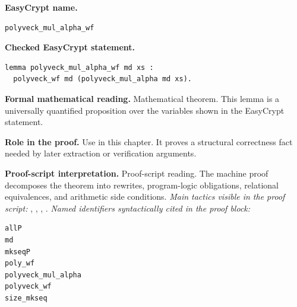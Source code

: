\begin{formaltheorem}
\noindent\textbf{EasyCrypt name.}
\begin{lstlisting}[language=EasyCrypt,basicstyle=\ttfamily\scriptsize]
polyveck_mul_alpha_wf
\end{lstlisting}
\noindent\textbf{Checked EasyCrypt statement.}
\begin{lstlisting}[language=EasyCrypt,basicstyle=\ttfamily\scriptsize]
lemma polyveck_mul_alpha_wf md xs :
  polyveck_wf md (polyveck_mul_alpha md xs).
\end{lstlisting}
\noindent\textbf{Formal mathematical reading.}
Mathematical theorem. This lemma is a universally quantified proposition over the variables shown in the EasyCrypt statement.

\noindent\textbf{Role in the proof.}
Use in this chapter. It proves a structural correctness fact needed by later extraction or verification arguments.

\noindent\textbf{Proof-script interpretation.}
Proof-script reading. The machine proof decomposes the theorem into rewrites, program-logic obligations, relational equivalences, and arithmetic side conditions.
\emph{Main tactics visible in the proof script:} , , , .
\emph{Named identifiers syntactically cited in the proof block:}
\begin{lstlisting}[language=EasyCrypt,basicstyle=\ttfamily\scriptsize]
allP
md
mkseqP
poly_wf
polyveck_mul_alpha
polyveck_wf
size_mkseq
\end{lstlisting}

\end{formaltheorem}

